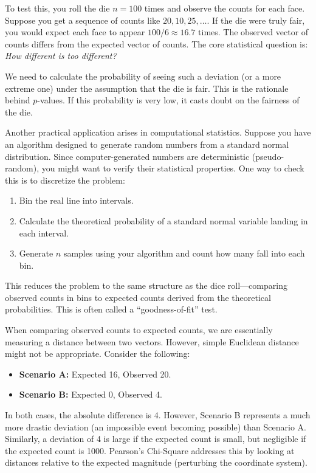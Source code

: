 To test this, you roll the die $n=100$ times and observe the counts for each face. Suppose you get a sequence of counts like $20, 10, 25, \dots$. If the die were truly fair, you would expect each face to appear $100/6 \approx 16.7$ times. The observed vector of counts differs from the expected vector of counts. The core statistical question is: \textit{How different is too different?}

We need to calculate the probability of seeing such a deviation (or a more extreme one) under the assumption that the die is fair. This is the rationale behind $p$-values. If this probability is very low, it casts doubt on the fairness of the die.

\begin{ex}
    
Another practical application arises in computational statistics. Suppose you have an algorithm designed to generate random numbers from a standard normal distribution. Since computer-generated numbers are deterministic (pseudo-random), you might want to verify their statistical properties.
One way to check this is to discretize the problem:
\begin{enumerate}
    \item Bin the real line into intervals.
    \item Calculate the theoretical probability of a standard normal variable landing in each interval.
    \item Generate $n$ samples using your algorithm and count how many fall into each bin.
\end{enumerate}
This reduces the problem to the same structure as the dice roll—comparing observed counts in bins to expected counts derived from the theoretical probabilities. This is often called a ``goodness-of-fit'' test.
\end{ex}

\begin{note}[on Distances]
When comparing observed counts to expected counts, we are essentially measuring a distance between two vectors. However, simple Euclidean distance might not be appropriate.
Consider the following:
\begin{itemize}
    \item \textbf{Scenario A:} Expected 16, Observed 20.
    \item \textbf{Scenario B:} Expected 0, Observed 4.
\end{itemize}
In both cases, the absolute difference is 4. However, Scenario B represents a much more drastic deviation (an impossible event becoming possible) than Scenario A. Similarly, a deviation of 4 is large if the expected count is small, but negligible if the expected count is 1000. Pearson's Chi-Square addresses this by looking at distances relative to the expected magnitude (perturbing the coordinate system).
\end{note}

